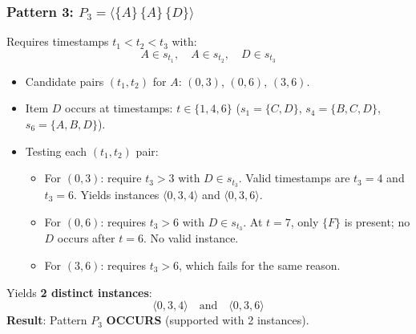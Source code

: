 \subsubsection{Pattern 3: $P_3 = \langle \{A\} \, \{A\} \, \{D\} \rangle$}
Requires timestamps $t_1 < t_2 < t_3$ with:
\begin{equation*}
A \in s_{t_1}, \quad A \in s_{t_2}, \quad D \in s_{t_3}
\end{equation*}
\begin{itemize}
    \item Candidate pairs $(t_1, t_2)$ for $A$: $(0, 3)$, $(0, 6)$, $(3, 6)$.
    \item Item $D$ occurs at timestamps: $t \in \{1, 4, 6\}$ ($s_1 = \{C, D\}$, $s_4 = \{B, C, D\}$, $s_6 = \{A, B, D\}$).
    \item Testing each $(t_1, t_2)$ pair:
    \begin{itemize}
        \item For $(0, 3)$: require $t_3 > 3$ with $D \in s_{t_3}$. Valid timestamps are $t_3 = 4$ and $t_3 = 6$.
        Yields instances $\langle 0, 3, 4 \rangle$ and $\langle 0, 3, 6 \rangle$.
        \item For $(0, 6)$: requires $t_3 > 6$ with $D \in s_{t_3}$. At $t = 7$, only $\{F\}$ is present; no $D$ occurs after $t=6$. No valid instance.
        \item For $(3, 6)$: requires $t_3 > 6$, which fails for the same reason.
    \end{itemize}
\end{itemize}
Yields \textbf{2 distinct instances}:
\begin{equation}
\langle 0, 3, 4 \rangle \quad \text{and} \quad \langle 0, 3, 6 \rangle
\end{equation}
\textbf{Result}: Pattern $P_3$ \textbf{OCCURS} (supported with 2 instances).

